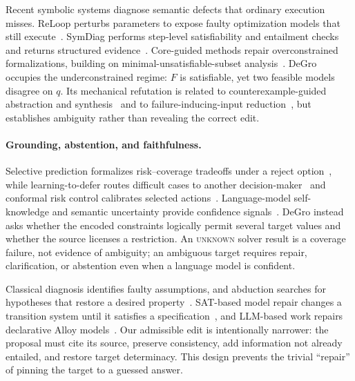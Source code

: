 \documentclass[sigconf,anonymous]{aamas}
\begin{document}
Recent symbolic systems diagnose semantic defects that ordinary execution misses.  ReLoop perturbs parameters to expose faulty optimization models that still execute~\cite{lian2026reloop}.  SymDiag performs step-level satisfiability and entailment checks and returns structured evidence~\cite{cui2026symdiag}.  Core-guided methods repair overconstrained formalizations, building on minimal-unsatisfiable-subset analysis~\cite{sarkar2026cores,liffiton2008mus}.  DeGro occupies the underconstrained regime: $F$ is satisfiable, yet two feasible models disagree on $q$.  Its mechanical refutation is related to counterexample-guided abstraction and synthesis~\cite{clarke2000cegar,solarlezama2006cegis} and to failure-inducing-input reduction~\cite{zeller2002simplifying}, but establishes ambiguity rather than revealing the correct edit.

\paragraph{Grounding, abstention, and faithfulness.}
Selective prediction formalizes risk--coverage tradeoffs under a reject option~\cite{elyaniv2010foundations,geifman2017selective,geifman2019selectivenet,cortes2016rejection}, while learning-to-defer routes difficult cases to another decision-maker~\cite{mozannar2020defer} and conformal risk control calibrates selected actions~\cite{angelopoulos2024conformal}.  Language-model self-knowledge and semantic uncertainty provide confidence signals~\cite{kadavath2022know,kuhn2023semantic}.  DeGro instead asks whether the encoded constraints logically permit several target values and whether the source licenses a restriction.  An \textsc{unknown} solver result is a coverage failure, not evidence of ambiguity; an ambiguous target requires repair, clarification, or abstention even when a language model is confident.

Classical diagnosis identifies faulty assumptions, and abduction searches for hypotheses that restore a desired property~\cite{reiter1987diagnosis,dillig2013abduction}.  SAT-based model repair changes a transition system until it satisfies a specification~\cite{attie2008modelrepair}, and LLM-based work repairs declarative Alloy models~\cite{alhanahnah2024alloyrepair}.  Our admissible edit is intentionally narrower: the proposal must cite its source, preserve consistency, add information not already entailed, and restore target determinacy.  This design prevents the trivial ``repair'' of pinning the target to a guessed answer.
\end{document}
